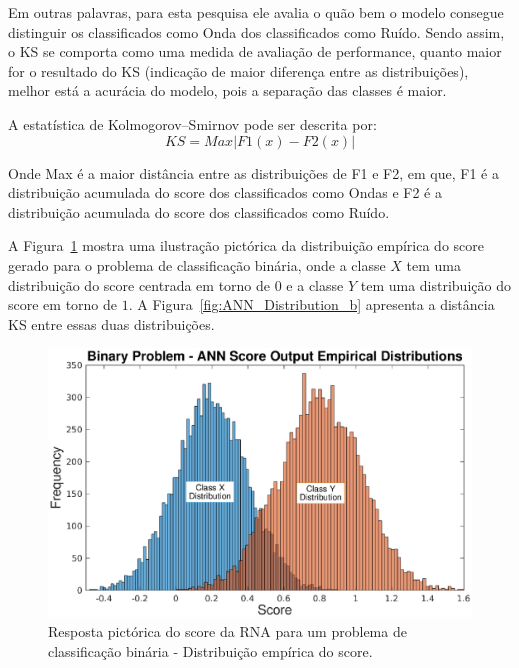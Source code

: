 Em outras palavras, para esta pesquisa ele avalia o quão bem o modelo consegue distinguir os classificados como Onda dos classificados como Ruído. Sendo assim, o KS se comporta como uma medida de avaliação de performance, quanto maior for o resultado do KS (indicação de maior diferença entre as distribuições), melhor está a acurácia do modelo, pois a separação das classes é maior. 

A estatística de Kolmogorov–Smirnov pode ser descrita por: 
\begin{equation}
KS = Max|F1(x)−F2(x)|
\label{eq:kolmogorov}
\end{equation}

Onde Max é a maior distância entre as distribuições de F1 e F2, em que, F1 é a distribuição acumulada do score dos classificados como Ondas e F2 é a distribuição acumulada do score dos classificados como Ruído.

A Figura~\ref{fig:ANN_Distribution_a} mostra uma ilustração pictórica da distribuição empírica do score gerado para o problema de classificação binária, onde a classe $X$ tem uma distribuição do score centrada em torno de $0$ e a classe $Y$ tem uma distribuição do score em torno de $1$. A Figura~\ref{fig:ANN_Distribution_b} apresenta a distância KS entre essas duas distribuições.

\begin{figure}[H]
\centering
\includegraphics[width=1\textwidth]{figuras/ANNScore_Output.eps}
\caption{Resposta pictórica do score da RNA para um problema de classificação binária - Distribuição empírica do score.}
\label{fig:ANN_Distribution_a}
\end{figure}

